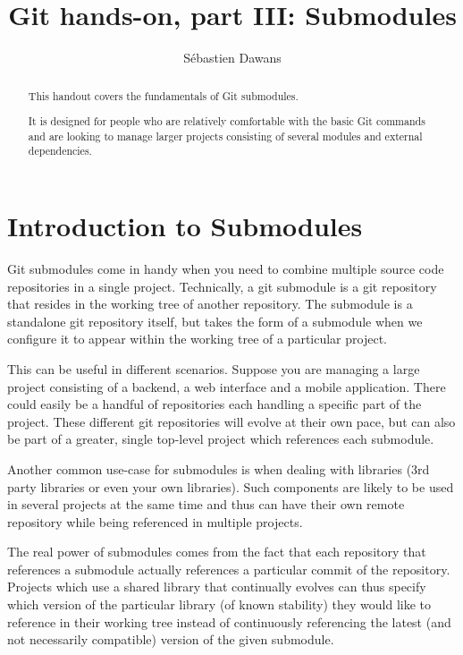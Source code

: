 \documentclass[a4paper]{../../common/tufte-latex/tufte-handout}
\title{Git hands-on, part III: Submodules}
\author{S\'ebastien Dawans}
\begin{document}
\maketitle%

\tableofcontents


\begin{abstract}
\noindent
This handout covers the fundamentals of Git submodules.

It is designed for people who are relatively comfortable with the basic Git commands and are looking to manage larger projects consisting of several modules and external dependencies.
\end{abstract}

\section{Introduction to Submodules}

Git submodules come in handy when you need to combine multiple source code repositories in a single project.
Technically, a git submodule is a git repository that resides in the working tree of another repository. The submodule is a standalone git repository itself, but takes the form of a submodule when we configure it to appear within the working tree of a particular project.

This can be useful in different scenarios. Suppose you are managing a large project consisting of a backend, a web interface and a mobile application. There could easily be a handful of repositories each handling a specific part of the project. These different git repositories will evolve at their own pace, but can also be part of a greater, single top-level project which references each submodule.

Another common use-case for submodules is when dealing with libraries (3rd party libraries or even your own libraries). Such components are likely to be used in several projects at the same time and thus can have their own remote repository while being referenced in multiple projects.

The real power of submodules comes from the fact that each repository that references a submodule actually references a particular commit of the repository. Projects which use a shared library that continually evolves can thus specify which version of the particular library (of known stability) they would like to reference in their working tree instead of continuously referencing the latest (and not necessarily compatible) version of the given submodule.
\end{document}

